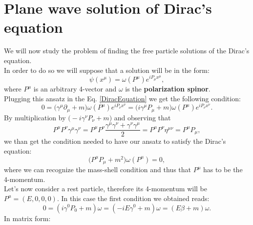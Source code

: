 \section{Plane wave solution of Dirac's equation}
We will now study the problem of finding the free particle solutions of the Dirac's equation.\\In order to do so we will suppose that a solution will be in the form:
\begin{equation*}
    \psi(x^\mu)=\omega(P^\mu)e^{iP_\mu x^\mu},
\end{equation*}
where $P^\mu$ is an arbitrary 4-vector and $\omega$ is the \textbf{polarization spinor}.\\
Plugging this ansatz in the Eq. \eqref{DiracEquation} we get the following condition:
\begin{equation*}
    0=\big(\gamma^\mu\partial_\mu+m\big)\omega(P^\mu)e^{iP_\nu x^\nu}=\big(i\gamma^\mu P_\mu+m\big)\omega(P^\mu)e^{iP_\nu x^\nu}.
\end{equation*} 
By multiplication by $\big(-i\gamma^\nu P_\nu+m\big)$ and observing that
\begin{equation*}
    P^\mu P^\nu \gamma^\mu \gamma^\nu=P^\mu P^\nu\frac{\gamma^\mu\gamma^\nu+\gamma^\nu\gamma^\mu}{2}=P^\mu P^\nu\eta^{\mu\nu}=P^\mu P_\mu,
\end{equation*}
we than get the condition needed to have our ansatz to satisfy the Dirac's equation:
\begin{equation*}
    \big(P^\mu P_\mu+m^2\big)\omega(P^\mu)=0,
\end{equation*}
where we can recognize the mass-shell condition and thus that $P^\mu$ has to be the 4-momentum.\\
Let's now consider a rest particle, therefore its 4-momentum will be $P^\mu=(E,0,0,0)$. In this case the first condition we obtained reads:
\begin{equation*}
    0=(i\gamma^0P_0+m)\omega=(-iE\gamma^0+m)\omega=(E\beta+m)\omega.
\end{equation*}
In matrix form:
